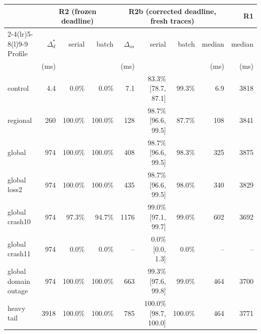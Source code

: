 \begin{tabular}{@{}lrrrrrrrr@{}}
\toprule
 & \multicolumn{3}{c}{R2 (frozen deadline)} & \multicolumn{4}{c}{R2b (corrected deadline, fresh traces)} & R1\\
\cmidrule(lr){2-4}\cmidrule(lr){5-8}\cmidrule(l){9-9}
Profile & $\Delta_d^{*}$ & serial & batch & $\Delta_{os}$ & serial & batch & median & median\\
 & (ms) & & & (ms) & & & (ms) & (ms)\\
\midrule
control & 4.4 & 0.0\% & 0.0\% & 7.1 & 83.3\% [78.7, 87.1] & 99.3\% & 6.9 & 3818\\
regional & 260 & 100.0\% & 100.0\% & 128 & 98.7\% [96.6, 99.5] & 87.7\% & 108 & 3841\\
global & 974 & 100.0\% & 100.0\% & 408 & 98.7\% [96.6, 99.5] & 98.3\% & 325 & 3875\\
global loss2 & 974 & 100.0\% & 100.0\% & 435 & 98.7\% [96.6, 99.5] & 98.0\% & 340 & 3829\\
global crash10 & 974 & 97.3\% & 94.7\% & 1176 & 99.0\% [97.1, 99.7] & 99.0\% & 602 & 3692\\
global crash11 & 974 & 0.0\% & 0.0\% & -- & 0.0\% [0.0, 1.3] & 0.0\% & -- & --\\
global domain outage & 974 & 100.0\% & 100.0\% & 663 & 99.3\% [97.6, 99.8] & 99.0\% & 464 & 3700\\
heavy tail & 3918 & 100.0\% & 100.0\% & 785 & 100.0\% [98.7, 100.0] & 100.0\% & 464 & 3771\\
\bottomrule
\end{tabular}
